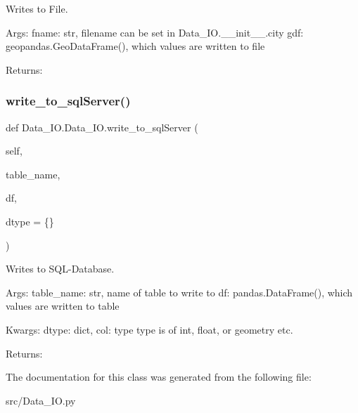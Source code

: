 \begin{DoxyVerb}Writes to File.

Args:
    fname: str, filename can be set in Data_IO.__init__.city
    gdf: geopandas.GeoDataFrame(), which values are written to file

Returns:
\end{DoxyVerb}
 \mbox{\label{class_data___i_o_1_1_data___i_o_a8e77138adf73f6baac7e31f3c2047962}} 
\subsubsection{\texorpdfstring{write\+\_\+to\+\_\+sql\+Server()}{write\_to\_sqlServer()}}
{\footnotesize\ttfamily def Data\+\_\+\+I\+O.\+Data\+\_\+\+I\+O.\+write\+\_\+to\+\_\+sql\+Server (\begin{DoxyParamCaption}\item[{}]{self,  }\item[{}]{table\+\_\+name,  }\item[{}]{df,  }\item[{}]{dtype = {\ttfamily \{\}} }\end{DoxyParamCaption})}

\begin{DoxyVerb}Writes to SQL-Database.

Args:
    table_name: str, name of table to write to
    df: pandas.DataFrame(), which values are written to table

Kwargs:
    dtype: dict, {col: type} type is of int, float, or geometry etc.

Returns:\end{DoxyVerb}
 

The documentation for this class was generated from the following file\+:\begin{DoxyCompactItemize}
\item 
src/Data\+\_\+\+I\+O.\+py\end{DoxyCompactItemize}
